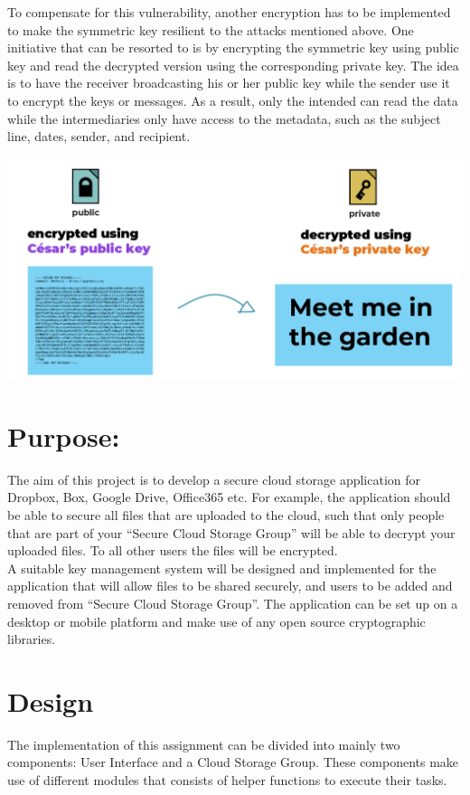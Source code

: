 \documentclass[12pt]{article}
\begin{document}
To compensate for this vulnerability, another encryption has to be implemented to make the symmetric key resilient to the attacks mentioned above. One initiative that can be resorted to is by encrypting the symmetric key using public key and read the decrypted version using the corresponding private key. The idea is to have the receiver broadcasting his or her public key while the sender use it to encrypt the keys or messages. As a result, only the intended can read the data while the intermediaries only have access to the metadata, such as the subject line, dates, sender, and recipient.\\

\begin{center}
\includegraphics[scale=0.5]{proper}
\end{center}
\newpage
\section*{Purpose:}
The aim of this project is to develop a secure cloud storage application for Dropbox, Box, Google Drive, Office365 etc. For example, the application should be able to secure all files that are uploaded to the cloud, such that only people that are part of your “Secure Cloud Storage Group” will be able to decrypt your uploaded files. To all other users the files will be encrypted. \\ 

A suitable key management system will be designed and implemented for the application that will allow files to be shared securely, and users to be added and removed from “Secure Cloud Storage Group”. The application can be set up on a desktop or mobile platform and make use of any open source cryptographic libraries.
\vspace*{10mm}
\section*{Design}
The implementation of this assignment can be divided into mainly two components: User Interface and a Cloud Storage Group. These components make use of different modules that consists of helper functions to execute their tasks. \\
\end{document}
